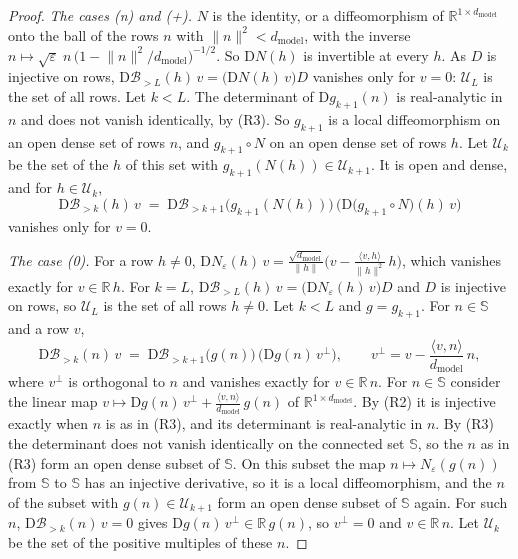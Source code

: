 \documentclass[10pt]{article}
\theoremstyle{definition}
\theoremstyle{remark}
\newcommand{\R}{\mathbb{R}}
\newcommand{\dm}{d_{\mathrm{model}}}
\newcommand{\Der}{\mathrm{D}}
\newcommand{\norm}[1]{\lVert #1\rVert}
\begin{document}
\begin{proof}
\emph{The cases (n) and (+).} $N$ is the identity, or a diffeomorphism of $\R^{1\times\dm}$ onto the ball of the rows $n$ with $\norm{n}^2 < \dm$, with the inverse $n \mapsto \sqrt{\varepsilon}\;n\,\big(1 - \norm{n}^2/\dm\big)^{-1/2}$. So $\Der N(h)$ is invertible at every $h$. As $D$ is injective on rows, $\Der\mathcal B_{>L}(h)\,v = \big(\Der N(h)\,v\big)D$ vanishes only for $v = 0$: $\mathcal U_L$ is the set of all rows. Let $k < L$. The determinant of $\Der g_{k+1}(n)$ is real-analytic in $n$ and does not vanish identically, by (R3). So $g_{k+1}$ is a local diffeomorphism on an open dense set of rows $n$, and $g_{k+1}\circ N$ on an open dense set of rows $h$. Let $\mathcal U_k$ be the set of the $h$ of this set with $g_{k+1}(N(h)) \in \mathcal U_{k+1}$. It is open and dense, and for $h \in \mathcal U_k$,
\[
\Der\mathcal B_{>k}(h)\,v \;=\; \Der\mathcal B_{>k+1}\big(g_{k+1}(N(h))\big)\,\Big(\Der\big(g_{k+1}\circ N\big)(h)\,v\Big)
\]
vanishes only for $v = 0$.

\emph{The case (0).} For a row $h \neq 0$, $\Der N_\varepsilon(h)\,v = \frac{\sqrt{\dm}}{\norm{h}}\big(v - \frac{\langle v, h\rangle}{\norm{h}^2}\,h\big)$, which vanishes exactly for $v \in \R\,h$. For $k = L$, $\Der\mathcal B_{>L}(h)\,v = \big(\Der N_\varepsilon(h)\,v\big)D$ and $D$ is injective on rows, so $\mathcal U_L$ is the set of all rows $h \neq 0$. Let $k < L$ and $g = g_{k+1}$. For $n \in \mathbb S$ and a row $v$,
\[
\Der\mathcal B_{>k}(n)\,v \;=\; \Der\mathcal B_{>k+1}\big(g(n)\big)\,\big(\Der g(n)\,v^\perp\big), \qquad v^\perp = v - \frac{\langle v, n\rangle}{\dm}\,n ,
\]
where $v^\perp$ is orthogonal to $n$ and vanishes exactly for $v \in \R\,n$. For $n \in \mathbb S$ consider the linear map $v \mapsto \Der g(n)\,v^\perp + \frac{\langle v, n\rangle}{\dm}\,g(n)$ of $\R^{1\times\dm}$. By (R2) it is injective exactly when $n$ is as in (R3), and its determinant is real-analytic in $n$. By (R3) the determinant does not vanish identically on the connected set $\mathbb S$, so the $n$ as in (R3) form an open dense subset of $\mathbb S$. On this subset the map $n \mapsto N_\varepsilon(g(n))$ from $\mathbb S$ to $\mathbb S$ has an injective derivative, so it is a local diffeomorphism, and the $n$ of the subset with $g(n) \in \mathcal U_{k+1}$ form an open dense subset of $\mathbb S$ again. For such $n$, $\Der\mathcal B_{>k}(n)\,v = 0$ gives $\Der g(n)\,v^\perp \in \R\,g(n)$, so $v^\perp = 0$ and $v \in \R\,n$. Let $\mathcal U_k$ be the set of the positive multiples of these $n$.
\end{proof}
\end{document}
